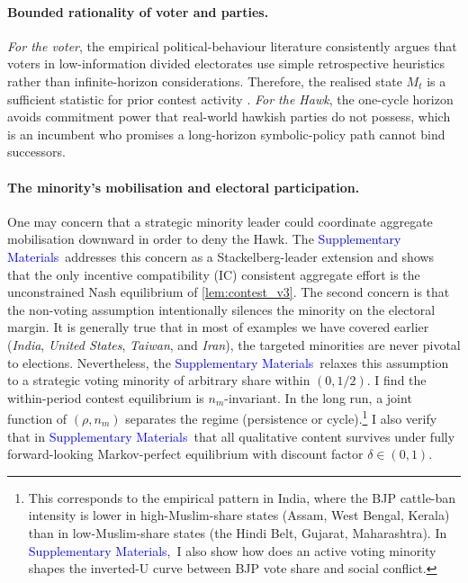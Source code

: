 \documentclass[11pt,twoside]{extarticle}
\newcommand{\suppmat}{\textcolor{blue}{Supplementary Materials}}
\begin{document}
\paragraph{Bounded rationality of voter and parties.} 

\emph{For the voter}, the empirical political-behaviour literature consistently argues that voters in low-information divided electorates use simple retrospective heuristics rather than infinite-horizon considerations. Therefore, the realised state $M_t$ is a sufficient statistic for prior contest activity \citep*{healyMyopicVotersNatural2009,achenDemocracyRealistsWhy2017}. 
\emph{For the Hawk}, the one-cycle horizon avoids commitment power that real-world hawkish parties do not possess, which is an incumbent who promises a long-horizon symbolic-policy path cannot bind successors.

\paragraph{The minority's mobilisation and electoral participation.} One may concern that a strategic minority leader could coordinate aggregate mobilisation downward in order to deny the Hawk. The \suppmat~addresses this concern as a Stackelberg-leader extension and shows that the only incentive compatibility (IC) consistent aggregate effort is the unconstrained Nash equilibrium of \autoref{lem:contest_v3}. The second concern is that the non-voting assumption intentionally silences the minority on the electoral margin. It is generally true that in most of examples we have covered earlier (\emph{India}, \emph{United States}, \emph{Taiwan}, and \emph{Iran}), the targeted minorities are never pivotal to elections. Nevertheless, the \suppmat~relaxes this assumption to a strategic voting minority of arbitrary share within $(0,1/2)$. 
I find the within-period contest equilibrium is $n_m$-invariant. 
In the long run, a joint function of $(\rho,n_m)$ separates the regime (persistence or cycle).\footnote{This corresponds to the empirical pattern in India, where the BJP cattle-ban intensity is lower in high-Muslim-share states (Assam, West Bengal, Kerala) than in low-Muslim-share states (the Hindi Belt, Gujarat, Maharashtra). In \suppmat,~I also show how does an active voting minority shapes the inverted-U curve between BJP vote share and social conflict.}
I also verify that in \suppmat~that all qualitative content survives under fully forward-looking Markov-perfect equilibrium with discount factor $\delta\in(0,1)$.
\end{document}
